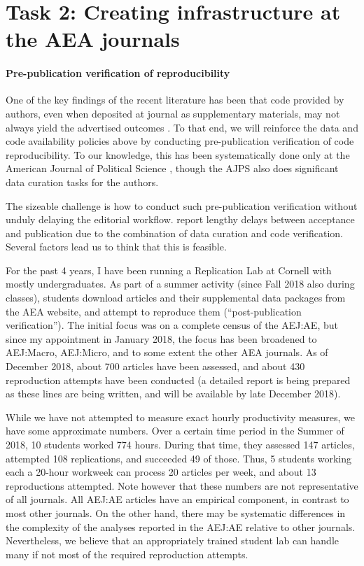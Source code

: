 \documentclass[AEJ]{AEA}
\begin{document}
\FloatBarrier
\section{Task 2: Creating infrastructure at the AEA journals}

\paragraph{Pre-publication verification of reproducibility} One of the key findings of the recent literature has been that code provided by authors, even when deposited at journal as supplementary materials, may not always yield the advertised outcomes \citep{Chang2015-dl,ChangAm.Econ.Rev.2017,Hoeffler2017a}. To that end, we will reinforce the data and code availability policies above by conducting pre-publication verification of code reproducibility. To our knowledge, this has been systematically done only at the American Journal of Political Science \citep{Christian2018}, though the AJPS also does significant data curation tasks for the authors.

The sizeable challenge is how to conduct such pre-publication verification without unduly delaying the editorial workflow. \cite{Christian2018} report lengthy delays between acceptance and publication due to the combination of data curation and code verification. Several factors lead us to think that this is feasible.

For the past 4 years, I have been running a Replication Lab at Cornell with mostly undergraduates. As part of a summer activity (since Fall 2018 also during classes), students download articles and their supplemental data packages from the AEA website, and attempt to reproduce them (``post-publication verification''). The initial focus was on a complete census of the AEJ:AE, but since my appointment in January 2018, the focus has been broadened to AEJ:Macro, AEJ:Micro, and to some extent the other AEA journals. As of December 2018, about 700 articles have been assessed, and about 430 reproduction attempts have been conducted 
(a detailed report is being prepared as these lines are being written, and will be available by late December 2018). 

While we have not attempted to measure exact hourly productivity measures, we have some approximate numbers. Over a certain time period in the Summer of 2018, 10 students worked 774 hours. During that time, they assessed 147 articles, attempted 108 replications, and succeeded 49 of those. Thus, 5 students working each a 20-hour workweek can process 20 articles per week, and about 13 reproductions attempted. Note however that these numbers are not representative of all journals. All AEJ:AE articles have an empirical component, in contrast to most other journals. On the other hand, there may be systematic differences in the complexity of the analyses reported in the AEJ:AE relative to other journals. Nevertheless, we believe that an appropriately trained student lab can handle many if not most of the required reproduction attempts.
\end{document}
